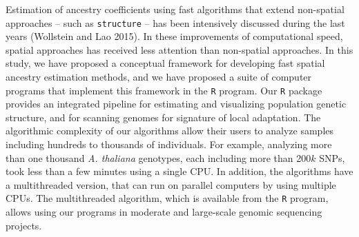 Estimation of ancestry coefficients using fast algorithms that extend non-spatial approaches -- such as {\tt structure} -- has been intensively discussed during the last years (Wollstein and Lao 2015). In these improvements of computational speed, spatial approaches has received less attention than non-spatial approaches. In this study, we have proposed a conceptual framework for developing fast spatial ancestry estimation methods, and we have proposed a suite of computer programs that implement this framework in the {\tt R} program. Our {\tt R} package provides an integrated pipeline for estimating and visualizing population genetic structure,  and for scanning genomes for signature of local adaptation. The algorithmic complexity of our algorithms allow their users to analyze samples including hundreds to thousands of individuals. For example, analyzing more than one thousand {\it A. thaliana} genotypes, each including more than 200$k$ SNPs, took less than a few minutes using a single CPU. In addition, the algorithms have a multithreaded version, that can run on parallel computers by using multiple CPUs. The multithreaded algorithm, which is available from the {\tt R} program, allows using our programs in moderate and large-scale genomic sequencing projects. 

 
 
 



 























